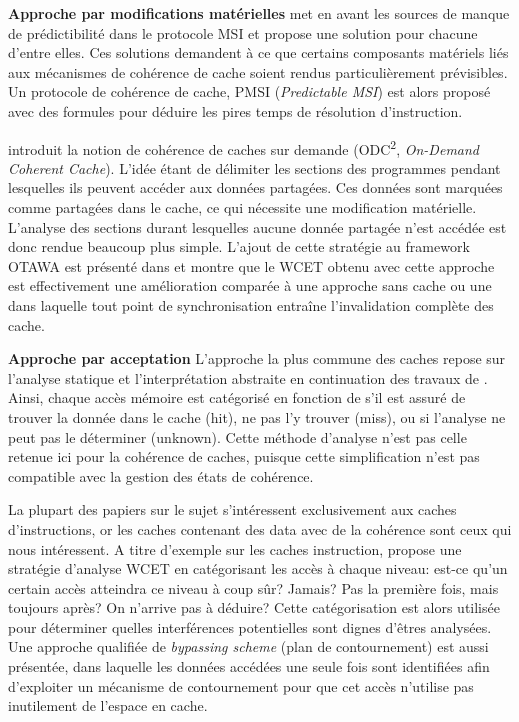 \noindent\textbf{Approche par modifications matérielles}
\cite{conf/rtas/HassanKP17} met en avant les sources de manque de prédictibilité
dans le protocole MSI et propose une solution pour chacune d'entre elles. Ces
solutions demandent à ce que certains composants matériels liés aux mécanismes
de cohérence de cache soient rendus particulièrement prévisibles. Un protocole
de cohérence de cache, PMSI (\textit{Predictable MSI}) est alors
proposé avec des formules pour déduire les
pires temps de résolution d'instruction.

\cite{doi:10.1002/cpe.3172} introduit la notion de cohérence de caches sur
demande (ODC\textsuperscript{2}, \textit{On-Demand Coherent Cache}). L'idée
étant de délimiter les sections des programmes pendant lesquelles ils peuvent
accéder aux données partagées.
Ces données sont marquées comme partagées dans le cache, ce qui
nécessite une modification matérielle. L'analyse des sections durant lesquelles
aucune donnée partagée n'est accédée est donc rendue beaucoup plus simple.
L'ajout de cette stratégie au framework OTAWA est présenté dans \cite{Py2015.1}
et montre que le WCET obtenu avec cette approche est effectivement une
amélioration comparée à une approche sans cache ou une dans laquelle tout point
de synchronisation entraîne l'invalidation complète des cache.

\noindent\textbf{Approche par acceptation}
L'approche la plus commune des caches
repose sur l'analyse statique et l'interprétation abstraite en continuation des
travaux de \cite{10.1023/A:1008186323068}. Ainsi,
chaque accès mémoire est catégorisé en fonction de s'il
est assuré de trouver la donnée
 dans le cache (hit),
 ne pas l'y trouver (miss),
 ou si l'analyse ne peut pas le
déterminer (unknown). Cette méthode d'analyse n'est pas celle retenue ici pour la
cohérence de caches, puisque cette simplification n'est pas compatible avec la
gestion des états de cohérence. 

La plupart des papiers sur le sujet s'intéressent exclusivement aux caches
d'instructions, or les caches contenant des data avec de la cohérence sont ceux qui nous intéressent.
A titre d'exemple sur les caches instruction,
\cite{10.1109/RTSS.2009.34} propose une stratégie d'analyse WCET
en catégorisant les accès à chaque niveau:
est-ce qu'un certain accès atteindra ce niveau à
coup sûr? Jamais? Pas la première fois, mais toujours après? On n'arrive pas à
déduire? Cette catégorisation est alors utilisée pour déterminer quelles
interférences potentielles sont dignes d'êtres analysées. Une approche
qualifiée de \textit{bypassing scheme} (plan de contournement) est aussi
présentée, dans laquelle les données accédées une seule fois sont identifiées
afin d'exploiter un mécanisme de contournement pour que cet accès n'utilise pas
inutilement de l'espace en cache.

